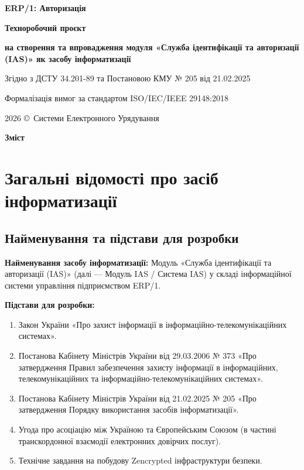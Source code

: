 \documentclass{article}
\newcommand\HUGE[1]{\fontsize{40}{40}\selectfont #1}
\begin{document}
\pagestyle{fancy}

\begin{titlepage}
  \AddToShipoutPictureBG*{\AtPageLowerLeft{\color{nato}\rule{\paperwidth}{\paperheight}}}
  \color{white}\thispagestyle{empty}\vspace*{3cm}\centering
  {\Huge  \textbf{ERP/1: Авторизація} \par} \vspace{1.5cm}
  {\HUGE  \textbf{Техноробочий проєкт} \par} \vspace{1.5cm}
  {\LARGE \textbf{на створення та впровадження модуля «Служба ідентифікації та авторизації (IAS)» як засобу інформатизації} \par} \vspace{1.5cm}
  {\large Згідно з ДСТУ 34.201-89 та Постановою КМУ № 205 від 21.02.2025 \par}
  {\large Формалізація вимог за стандартом ISO/IEC/IEEE 29148:2018 \par}
  \vfill
  {\large 2026 \copyright\ Системи Електронного Урядування \par}
\end{titlepage}

\newpage

\begin{center}
  {\Huge\color{nato}\bfseries Зміст\par}
\end{center}
\vspace{40pt}
\tableofcontents

\newpage

\section{Загальні відомості про засіб інформатизації}

\subsection{Найменування та підстави для розробки}
\textbf{Найменування засобу інформатизації:} Модуль «Служба ідентифікації та авторизації (IAS)» (далі --- Модуль IAS / Система IAS) у складі інформаційної системи управління підприємством ERP/1.

\textbf{Підстави для розробки:}
\begin{enumerate}
    \item Закон України «Про захист інформації в інформаційно-телекомунікаційних системах».
    \item Постанова Кабінету Міністрів України від 29.03.2006 № 373 «Про затвердження Правил забезпечення захисту інформації в інформаційних, телекомунікаційних та інформаційно-телекомунікаційних системах».
    \item Постанова Кабінету Міністрів України від 21.02.2025 № 205 «Про затвердження Порядку використання засобів інформатизації».
    \item Угода про асоціацію між Україною та Європейським Союзом (в частині транскордонної взаємодії електронних довірчих послуг).
    \item Технічне завдання на побудову Zencrypted інфраструктури безпеки.
\end{enumerate}
\end{document}
